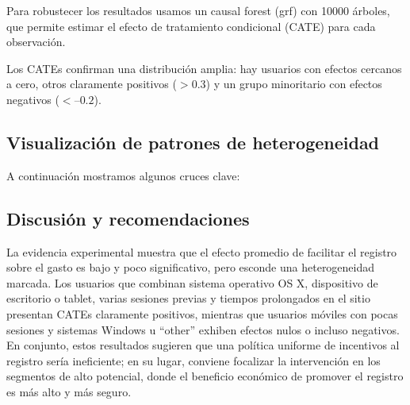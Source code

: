\documentclass[conference]{IEEEtran}
\begin{document}
Para robustecer los resultados usamos un causal forest (grf) con 10000 árboles, que permite estimar el efecto de tratamiento condicional (CATE) para cada observación.

Los CATEs confirman una distribución amplia:
hay usuarios con efectos cercanos a cero, otros claramente positivos ($>0.3$) y un grupo minoritario con efectos negativos ($<–0.2$).

\subsection{Visualización de patrones de heterogeneidad}

A continuación mostramos algunos cruces clave:

\subsection{Discusión y recomendaciones}

La evidencia experimental muestra que el efecto promedio de facilitar el registro sobre el gasto es bajo y poco significativo, pero esconde una heterogeneidad marcada. Los usuarios que combinan sistema operativo OS X, dispositivo de escritorio o tablet, varias sesiones previas y tiempos prolongados en el sitio presentan CATEs claramente positivos, mientras que usuarios móviles con pocas sesiones y sistemas Windows u “other” exhiben efectos nulos o incluso negativos. En conjunto, estos resultados sugieren que una política uniforme de incentivos al registro sería ineficiente; en su lugar, conviene focalizar la intervención en los segmentos de alto potencial, donde el beneficio económico de promover el registro es más alto y más seguro.
\end{document}
